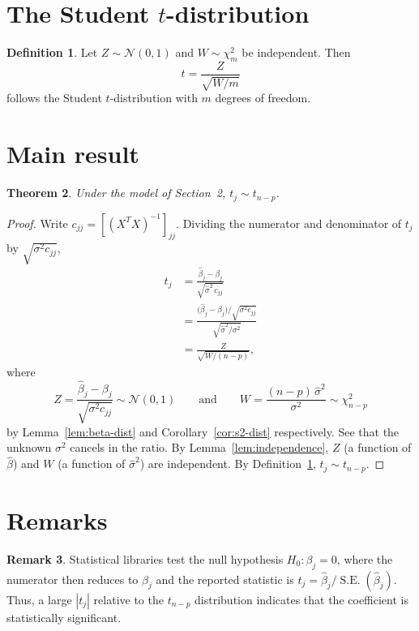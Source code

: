 \documentclass[11pt]{article}
\newtheorem{theorem}{Theorem}
\theoremstyle{definition}
\newtheorem{definition}[theorem]{Definition}
\newtheorem{remark}[theorem]{Remark}
\begin{document}
\section{The Student $t$-distribution}
\begin{definition}\label{def:t-dist}
    Let $Z \sim \mathcal{N}(0,1)$ and $W \sim \chi^2_m$ be independent. Then
    $$t = \frac{Z}{\sqrt{W / m}}$$
    follows the Student $t$-distribution with $m$ degrees of freedom.
\end{definition}

\section{Main result}
\begin{theorem}
    Under the model of Section~2, $t_j \sim t_{n-p}$.
\end{theorem}

\begin{proof}
    Write $c_{jj} = \left[(X^T X)^{-1}\right]_{jj}$. Dividing the numerator and
    denominator of $t_j$ by $\sqrt{\sigma^2 c_{jj}}$,
    \begin{align*}
        t_j &= \frac{\widehat{\beta}_j - \beta_j}{\sqrt{\widehat{\sigma}^2 \, c_{jj}}} \\
            &= \frac{\big(\widehat{\beta}_j - \beta_j\big) \big/ \sqrt{\sigma^2 c_{jj}}}{\sqrt{\widehat{\sigma}^2 / \sigma^2}} \\
            &= \frac{Z}{\sqrt{W / (n-p)}},
    \end{align*}
    where
    $$Z = \frac{\widehat{\beta}_j - \beta_j}{\sqrt{\sigma^2 c_{jj}}} \sim \mathcal{N}(0,1)
    \qquad \text{and} \qquad
    W = \frac{(n-p)\,\widehat{\sigma}^2}{\sigma^2} \sim \chi^2_{n-p}$$
    by Lemma~\ref{lem:beta-dist} and Corollary~\ref{cor:s2-dist} respectively.
    See that the unknown $\sigma^2$ cancels in the ratio. By
    Lemma~\ref{lem:independence}, $Z$ (a function of $\widehat{\beta}$) and $W$ (a
    function of $\widehat{\sigma}^2$) are independent. By
    Definition~\ref{def:t-dist}, $t_j \sim t_{n-p}$.
\end{proof}

\section{Remarks}
\begin{remark}
    Statistical libraries test the null hypothesis $H_0 \colon \beta_j = 0$,
    where the numerator then reduces to $\widehat{\beta}_j$ and the reported
    statistic is $t_j = \widehat{\beta}_j / \operatorname{S.E.}(\widehat{\beta}_j)$. Thus, a
    large $|t_j|$ relative to the $t_{n-p}$ distribution indicates that the
    coefficient is statistically significant.
\end{remark}
\end{document}
